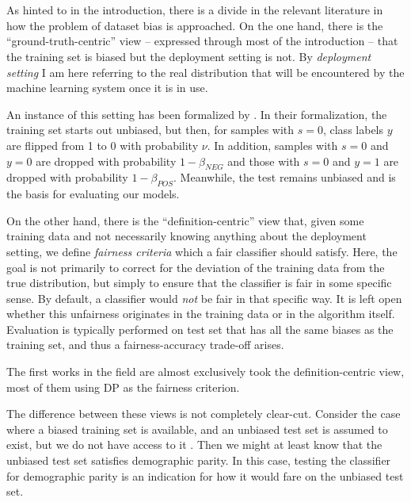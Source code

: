 \section{}\label{two-views-of-the-dataset-bias-problem}
As hinted to in the introduction,
there is a divide in the relevant literature in how the problem of dataset bias is approached.
On the one hand, there is the ``ground-truth-centric'' view -- expressed through most of the introduction --
that the training set is biased but the deployment setting is not.
By \emph{deployment setting} I am here referring to the real distribution
that will be encountered by the machine learning system once it is in use.


An instance of this setting has been formalized by \citet{blum2020recovering}.
In their formalization, the training set starts out unbiased,
but then, for samples with \(s=0\), class labels \(y\) are flipped from 1 to 0 with probability \(\nu\).
In addition, samples with \(s=0\) and \(y=0\) are dropped with probability \(1-\beta_\mathit{NEG}\)
and those with \(s=0\) and \(y=1\) are dropped with probability \(1-\beta_\mathit{POS}\).
Meanwhile, the test remains unbiased and is the basis for evaluating our models.

On the other hand, there is the ``definition-centric'' view that,
given some training data and not necessarily knowing anything about the deployment setting,
we define \emph{fairness criteria} which a fair classifier should satisfy.
Here, the goal is not primarily to correct for the deviation of the training data from the true distribution,
but simply to ensure that the classifier is fair in some specific sense.
By default, a classifier would \emph{not} be fair in that specific way.
It is left open whether this unfairness originates in the training data or in the algorithm itself.
Evaluation is typically performed on test set that has all the same biases as the training set,
and thus a fairness-accuracy trade-off arises.

The first works in the field are almost exclusively took the definition-centric view,
most of them using \acf{DP} \citep{dwork2012fairness} as the fairness criterion.

The difference between these views is not completely clear-cut.
Consider the case where a biased training set is available,
and an unbiased test set is assumed to exist, but we do not have access to it \citep{jiang2020identifying}.
Then we might at least know that the unbiased test set satisfies demographic parity.
In this case, testing the classifier for demographic parity is an indication
for how it would fare on the unbiased test set.

